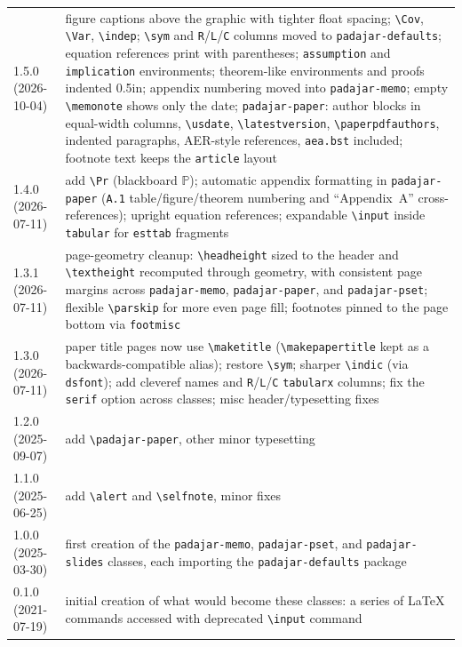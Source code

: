 \documentclass[11pt]{padajar-memo}
\newcommand{\ttslash}[1]{\texttt{\textbackslash #1}}
\begin{document}
\begin{tabular}{T p{\textwidth-1.75in}}
	1.5.0 (2026-10-04) & figure captions above the graphic with tighter float spacing; \ttslash{Cov}, \ttslash{Var}, \ttslash{indep}; \ttslash{sym} and \texttt{R}/\texttt{L}/\texttt{C} columns moved to \texttt{padajar-defaults}; equation references print with parentheses; \texttt{assumption} and \texttt{implication} environments; theorem-like environments and proofs indented 0.5in; appendix numbering moved into \texttt{padajar-memo}; empty \ttslash{memonote} shows only the date; \texttt{padajar-paper}: author blocks in equal-width columns, \ttslash{usdate}, \ttslash{latestversion}, \ttslash{paperpdfauthors}, indented paragraphs, AER-style references, \texttt{aea.bst} included; footnote text keeps the \texttt{article} layout \\
	1.4.0 (2026-07-11) & add \ttslash{Pr} (blackboard $\mathbb{P}$); automatic appendix formatting in \texttt{padajar-paper} (\texttt{A.1} table/figure/theorem numbering and ``Appendix~A'' cross-references); upright equation references; expandable \ttslash{input} inside \texttt{tabular} for \texttt{esttab} fragments \\
	1.3.1 (2026-07-11) & page-geometry cleanup: \ttslash{headheight} sized to the header and \ttslash{textheight} recomputed through geometry, with consistent page margins across \texttt{padajar-memo}, \texttt{padajar-paper}, and \texttt{padajar-pset}; flexible \ttslash{parskip} for more even page fill; footnotes pinned to the page bottom via \texttt{footmisc} \\
	1.3.0 (2026-07-11) & paper title pages now use \ttslash{maketitle} (\ttslash{makepapertitle} kept as a backwards-compatible alias); restore \ttslash{sym}; sharper \ttslash{indic} (via \texttt{dsfont}); add cleveref names and \texttt{R}/\texttt{L}/\texttt{C} \texttt{tabularx} columns; fix the \texttt{serif} option across classes; misc header/typesetting fixes \\
	1.2.0 (2025-09-07) & add \ttslash{padajar-paper}, other minor typesetting \\
	1.1.0 (2025-06-25) &  add \ttslash{alert} and \ttslash{selfnote}, minor fixes\\
	1.0.0 (2025-03-30) & first creation of the \texttt{padajar-memo}, \texttt{padajar-pset}, and \texttt{padajar-slides} classes, each importing the \texttt{padajar-defaults} package  \\
	0.1.0 (2021-07-19) & initial creation of what would become these classes: a series of \LaTeX{} commands accessed with deprecated \ttslash{input} command
\end{tabular}
\end{document}

